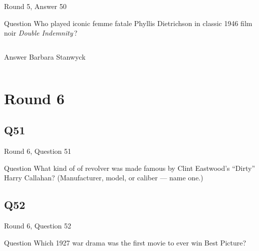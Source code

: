 \documentclass[11pt]{beamer}
\begin{document}
\begin{frame}[t]{Round 5, Answer 50}
\vspace{2em}
\begin{block}{Question}
Who played iconic femme fatale Phyllis Dietrichson in classic 1946 film noir \emph{Double Indemnity}\,?
\end{block}
\pause{}
\begin{columns}[T,totalwidth=\linewidth]
\begin{column}{0.35\linewidth}
\begin{block}{Answer}
Barbara Stanwyck
\end{block}
\end{column}
\begin{column}{0.6\linewidth}
\begin{center}
\texttt{[image: \{Images/stanwyck\_doubleindemnity]}.png}
\end{center}
\end{column}
\end{columns}
\end{frame}
    

\section{Round 6}
    

\subsection*{Q51}
\begin{frame}[t]{Round 6, Question 51}
\vspace{2em}
\begin{block}{Question}
What kind of of revolver was made famous by Clint Eastwood's ``Dirty'' Harry Callahan? (Manufacturer, model, or caliber — name one.)
\end{block}
\end{frame}
    

\subsection*{Q52}
\begin{frame}[t]{Round 6, Question 52}
\vspace{2em}
\begin{block}{Question}
Which 1927 war drama was the first movie to ever win Best Picture?
\end{block}
\end{frame}
    
\end{document}
